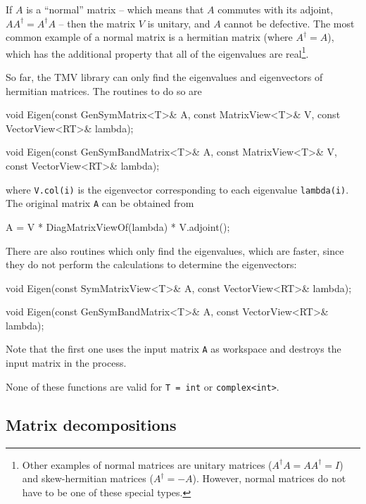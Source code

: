 \documentclass[twoside,letterpaper,11pt]{article}
\renewcommand{\tt}[1]{{\lstinline {#1}}}
\begin{document}
If $A$ is a ``normal'' matrix -- which means that $A$ commutes with its adjoint,
$AA^\dagger = A^\dagger A$ -- then the 
matrix $V$ is unitary, and $A$ cannot be defective.  
The most common example of a normal matrix is a hermitian matrix
(where $A^\dagger = A$), which has
the additional property that all of the eigenvalues are real\footnote{
Other examples of normal matrices are unitary matrices ($A^\dagger A = AA^\dagger = I$)
and skew-hermitian matrices ($A^\dagger = -A$).  However, normal matrices do
not have to be one of these special types.}.

So far, the TMV library can only find the eigenvalues and eigenvectors 
of hermitian matrices.  The routines to do so are 
\begin{tmvcode}
void Eigen(const GenSymMatrix<T>& A,
      const MatrixView<T>& V, const VectorView<RT>& lambda);

void Eigen(const GenSymBandMatrix<T>& A,
      const MatrixView<T>& V, const VectorView<RT>& lambda);
\end{tmvcode}
where \tt{V.col(i)} is the eigenvector corresponding to each eigenvalue \tt{lambda(i)}.
The original matrix \tt{A} can be obtained from
\begin{tmvcode}
A = V * DiagMatrixViewOf(lambda) * V.adjoint();
\end{tmvcode}

There are also routines which only find the eigenvalues, which are faster, since they
do not perform the calculations to determine the eigenvectors:
\begin{tmvcode}
void Eigen(const SymMatrixView<T>& A, const VectorView<RT>& lambda);

void Eigen(const GenSymBandMatrix<T>& A, const VectorView<RT>& lambda);
\end{tmvcode}
Note that the first one uses the input matrix \tt{A} as workspace and destroys the 
input matrix in the process.

None of these functions are valid for \tt{T = int} or \tt{complex<int>}.

\subsection{Matrix decompositions}
\label{Decompositions}
\end{document}
